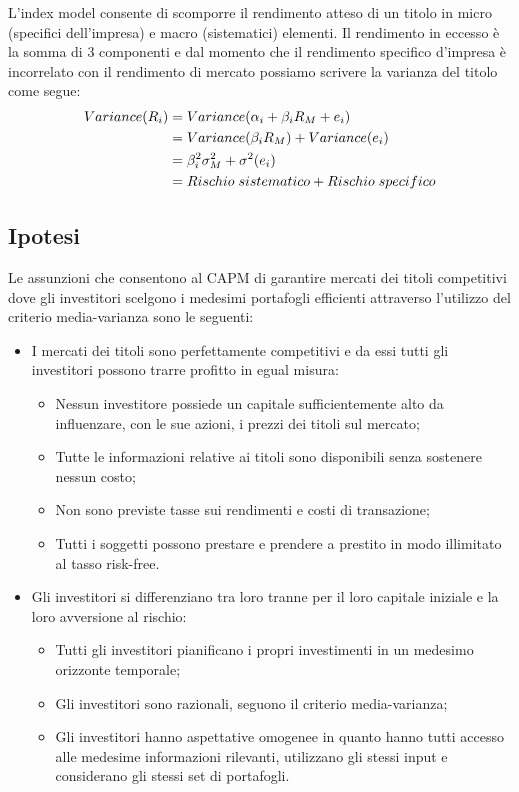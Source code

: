 L'index model consente di scomporre il rendimento atteso di un titolo in micro (specifici dell'impresa) e macro (sistematici) elementi. Il rendimento in eccesso è la somma di 3 componenti e dal momento che il rendimento specifico d'impresa è incorrelato con il rendimento di mercato possiamo scrivere la varianza del titolo come segue: 
\begin{equation}
\begin{split}
Variance(R_{i}) &= Variance(\alpha_{i}+\beta_{i}R_{M}+e_{i}) \\
&= Variance(\beta_{i}R_{M})+Variance(e_{i})\\
& = \beta^2_{i}\sigma^2_{M} +\sigma^2(e_{i}) \\
&= Rischio \hspace{0,1cm}  sistematico + Rischio \hspace{0,1cm}  specifico
\end{split}
\end{equation}
\subsection{Ipotesi}

Le assunzioni che consentono al CAPM di garantire mercati dei titoli competitivi dove gli investitori scelgono i medesimi portafogli efficienti attraverso l'utilizzo del criterio media-varianza sono le seguenti:
\begin{itemize}
	\item I mercati dei titoli sono perfettamente competitivi e da essi tutti gli investitori possono trarre profitto in egual misura:
	\begin{itemize}
		\item 	Nessun investitore possiede un capitale sufficientemente alto da influenzare, con le sue azioni, i prezzi dei titoli sul mercato;
		\item Tutte le informazioni relative ai titoli sono disponibili senza sostenere nessun costo;
		\item Non sono previste tasse sui rendimenti e costi di transazione;
		\item Tutti i soggetti possono prestare e prendere a prestito in modo illimitato al tasso risk-free.
	\end{itemize}
\item Gli investitori si differenziano tra loro tranne per il loro capitale iniziale e la loro avversione al rischio:
\begin{itemize}
	\item Tutti gli investitori pianificano i propri investimenti in un medesimo orizzonte temporale;
	\item Gli investitori sono razionali, seguono il criterio media-varianza;
	\item Gli investitori hanno aspettative omogenee in quanto hanno tutti accesso alle medesime informazioni rilevanti, utilizzano gli stessi input e considerano gli stessi set di portafogli. 
\end{itemize}
\end{itemize}

